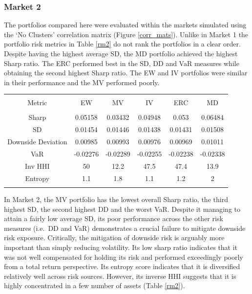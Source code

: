 \documentclass[11pt,preprint, authoryear]{elsarticle}
\let\origtable\table
\let\endorigtable\endtable
\renewenvironment{table}[1][2] {
    \expandafter\origtable\expandafter[H]
} {
    \endorigtable
}
\numberwithin{equation}{section}
\numberwithin{figure}{section}
\numberwithin{table}{section}
\begin{document}
\hypertarget{market-2}{%
\subsubsection{Market 2}\label{market-2}}

The portfolios compared here were evaluated within the markets simulated
using the `No Clusters' correlation matrix (Figure \ref{corr_mats}).
Unlike in Market 1 the portfolio risk metrics in Table \ref{rm2} do not
rank the portfolios in a clear order. Despite having the highest average
SD, the MD portfolio achieved the highest Sharp ratio. The ERC performed
best in the SD, DD and VaR measures while obtaining the second highest
Sharp ratio. The EW and IV portfolios were similar in their performance
and the MV performed poorly.

\begin{table}[!htbp] \centering 
  \caption{Market 2 - Portfolio Risk Metrics} 
  \label{rm2} 
\begin{tabular}{@{\extracolsep{5pt}} cccccc} 
\\[-1.8ex]\hline 
\hline \\[-1.8ex] 
Metric & EW & MV & IV & ERC & MD \\ 
\hline \\[-1.8ex] 
Sharp & 0.05158 & 0.03432 & 0.04948 & 0.053 & 0.06484 \\ 
SD & 0.01454 & 0.01446 & 0.01438 & 0.01431 & 0.01508 \\ 
Downside Deviation & 0.00985 & 0.00993 & 0.00976 & 0.00969 & 0.01011 \\ 
VaR & -0.02276 & -0.02289 & -0.02255 & -0.02238 & -0.02338 \\ 
Inv HHI & 50 & 12.2 & 47.5 & 47.4 & 13.9 \\ 
Entropy & 1.1 & 1.8 & 1.1 & 1.2 & 2 \\ 
\hline \\[-1.8ex] 
\end{tabular} 
\end{table}

In Market 2, the MV portfolio has the lowest overall Sharp ratio, the
third highest SD, the second highest DD and the worst VaR. Despite it
managing to attain a fairly low average SD, its poor performance across
the other risk measures (i.e.~DD and VaR) demonstrates a crucial failure
to mitigate downside risk exposure. Critically, the mitigation of
downside risk is arguably more important than simply reducing
volatility. Its low sharp ratio indicates that it was not well
compensated for holding its risk and performed exceedingly poorly from a
total return perspective. Its entropy score indicates that it is
diversified relatively well across risk sources. However, its inverse
HHI suggests that it is highly concentrated in a few number of assets
(Table \ref{rm2}).
\end{document}
